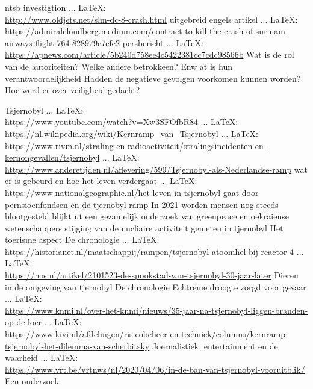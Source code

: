 \begin{thebibliography}{99}
{{{{{{{	ntsb investigtion
	 ... \LaTeX:\\ \url{http://www.oldjets.net/slm-dc-8-crash.html}
	uitgebreid engels artikel
	 ... \LaTeX:\\ \url{https://admiralcloudberg.medium.com/contract-to-kill-the-crash-of-surinam-airways-flight-764-828979c7efe2}
	persbericht
	 ... \LaTeX:\\ \url{https://apnews.com/article/5b240d758ee4c5422381cc7cdc98566b}
	Wat is de rol van de autoriteiten?
	Welke andere betrokkeen? Enw at is hun verantwoordelijkheid
	Hadden de negatieve gevolgen voorkomen kunnen worden?
	Hoe werd er over veiligheid gedacht?
	
	
	
	
	Tsjernobyl
	 ... \LaTeX:\\ \url{https://www.youtube.com/watch?v=Xw3SFOfbR84}
	 ... \LaTeX:\\ \url{https://nl.wikipedia.org/wiki/Kernramp_van_Tsjernobyl}
	 ... \LaTeX:\\ \url{https://www.rivm.nl/straling-en-radioactiviteit/stralingsincidenten-en-kernongevallen/tsjernobyl}
	 ... \LaTeX:\\ \url{https://www.anderetijden.nl/aflevering/599/Tsjernobyl-als-Nederlandse-ramp}
	wat er is gebeurd en hoe het leven verdergaat
	 ... \LaTeX:\\ \url{https://www.nationalgeographic.nl/het-leven-in-tsjernobyl-gaat-door}
	pernsioenfondsen en de tjernobyl ramp
	In 2021 worden mensen nog steeds blootgesteld blijkt ut een gezamelijk onderzoek van greenpeace en oekraiense wetenschappers
	stijging van de nucliaire activiteit gemeten in tjernobyl
	Het toerisme  aspect
	De chronologie
	 ... \LaTeX:\\ \url{https://historianet.nl/maatschappij/rampen/tsjernobyl-atoomhel-bij-reactor-4}
	 ... \LaTeX:\\ \url{https://nos.nl/artikel/2101523-de-spookstad-van-tsjernobyl-30-jaar-later}
	Dieren in de omgeving van tjernobyl
	De chronologie
	Echtreme droogte zorgd voor gevaar
	 ... \LaTeX:\\ \url{https://www.knmi.nl/over-het-knmi/nieuws/35-jaar-na-tsjernobyl-liggen-branden-op-de-loer}
	 ... \LaTeX:\\ \url{https://www.kivi.nl/afdelingen/risicobeheer-en-techniek/columns/kernramp-tsjernobyl-het-dilemma-van-scherbitsky}
	Joernalistiek, entertainment en de waarheid
	 ... \LaTeX:\\ \url{https://www.vrt.be/vrtnws/nl/2020/04/06/in-de-ban-van-tsjernobyl-vooruitblik/}
	Een onderzoek
	
}}}}}}}
\end{thebibliography}
